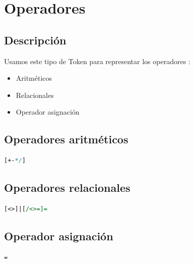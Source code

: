             \hfill
            \clearpage




	\section{Operadores}

        \subsection{Descripción}
        
            Usamos este tipo de Token para representar los operadores :
            
            \begin{itemize}
            
                \item Aritméticos
                \item Relacionales
                \item Operador asignación
                
            \end{itemize}
        
        \subsection{Operadores aritméticos}
        
            \begin{lstlisting}[language=Perl]
[+-*/]
            \end{lstlisting}

        \subsection{Operadores relacionales}

            \begin{lstlisting}[language=Perl]
[<>]|[/<>=]=
            \end{lstlisting}
            
        \subsection{Operador asignación}

            \begin{lstlisting}[language=Perl]
=
            \end{lstlisting}

